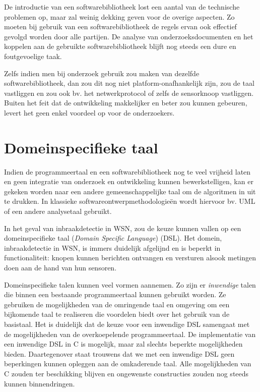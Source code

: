 De introductie van een softwarebibliotheek lost een aantal van de technische
problemen op, maar zal weinig dekking geven voor de overige aspecten. Zo moeten
bij gebruik van een softwarebibliotheek de regels ervan ook effectief gevolgd
worden door alle partijen. De analyse van onderzoeksdocumenten en het koppelen
aan de gebruikte softwarebibliotheek blijft nog steeds een dure en
foutgevoelige taak.

Zelfs indien men bij onderzoek gebruik zou maken van dezelfde
softwarebibliotheek, dan zou dit nog niet platform-onafhankelijk zijn, zou de
taal vastliggen en zou ook bv. het netwerkprotocol of zelfs de sensorknoop
vastliggen. Buiten het feit dat de ontwikkeling makkelijker en beter zou kunnen
gebeuren, levert het geen enkel voordeel op voor de onderzoekers.

\vspace{-3mm}

\section{Domeinspecifieke taal}
\label{section:solution-dsl}

Indien de programmeertaal en een softwarebibliotheek nog te veel vrijheid laten
en geen integratie van onderzoek en ontwikkeling kunnen bewerkstelligen, kan er
gekeken worden naar een andere gemeenschappelijke taal om de algoritmen in uit
te drukken. In klassieke softwareontwerpmethodologie\"en wordt hiervoor bv. UML
\citep{url:uml} of een andere analysetaal gebruikt.

In het geval van inbraakdetectie in WSN, zou de keuze kunnen vallen op een
domeinspecifieke taal (\emph{Domain Specific Language})
(DSL)\citep{van2000domain, mernik2005and, fowler2010domain}. Het domein,
inbraakdetectie in WSN, is immers duidelijk afgelijnd en is beperkt in
functionaliteit: knopen kunnen berichten ontvangen en versturen alsook metingen
doen aan de hand van hun sensoren.

Domeinspecifieke talen kunnen veel vormen aannemen. Zo zijn er \emph{inwendige}
talen die binnen een bestaande programmeertaal kunnen gebruikt worden. Ze
gebruiken de mogelijkheden van de omringende taal en omgeving om een bijkomende
taal te realiseren die voordelen biedt over het gebruik van de basistaal. Het
is duidelijk dat de keuze voor een inwendige DSL samengaat met de mogelijkheden
van de overkoepelende programmeertaal. De implementatie van een inwendige DSL
in C is mogelijk, maar zal slechts beperkte mogelijkheden bieden. Daartegenover
staat trouwens dat we met een inwendige DSL geen beperkingen kunnen opleggen
aan de omkaderende taal. Alle mogelijkheden van C zouden ter beschikking
blijven en ongewenste constructies zouden nog steeds kunnen binnendringen.


